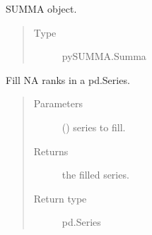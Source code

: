 \documentclass[letterpaper,10pt,english]{sphinxmanual}
\begin{document}
\begin{fulllineitems}
\begin{fulllineitems}
\begin{quote}
\begin{description}
\end{description}\end{quote}

\end{fulllineitems}


\begin{fulllineitems}
\label{\detokenize{_modules/cosifer.combiners:cosifer.combiners.summa.Summa.summa_object}}
SUMMA object.
\begin{quote}\begin{description}
\item[{Type}] \leavevmode
pySUMMA.Summa

\end{description}\end{quote}

\end{fulllineitems}


\begin{fulllineitems}
\end{fulllineitems}


\end{fulllineitems}


\begin{fulllineitems}
\label{\detokenize{_modules/cosifer.combiners:cosifer.combiners.summa.fill_na_ranks}}
Fill NA ranks in a pd.Series.
\begin{quote}\begin{description}
\item[{Parameters}] \leavevmode
{} () \textendash{} series to fill.

\item[{Returns}] \leavevmode
the filled series.

\item[{Return type}] \leavevmode
pd.Series

\end{description}\end{quote}

\end{fulllineitems}
\end{document}
